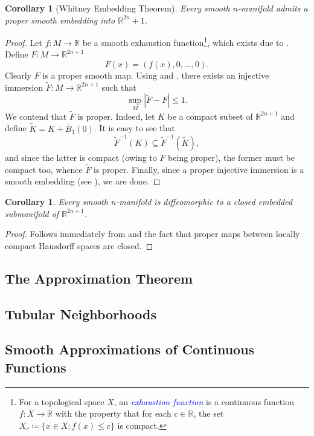 \documentclass[11pt]{article}
\theoremstyle{thmstyle}
\theoremstyle{defstyle}
\newtheorem{corollary}[theorem]{Corollary}
\newcommand{\R}{\mathbb{R}}
\newcommand{\wt}[1]{\widetilde{#1}}
\newcommand{\define}[1]{\textcolor{blue}{\textit{#1}}}
\renewcommand{\le}{\leqslant}
\begin{document}
\begin{corollary}[Whitney Embedding Theorem]
	Every smooth $n$-manifold admits a proper smooth embedding into $\R^{2n} + 1$.
\end{corollary}
\begin{proof}
	Let $f\colon M\to\R$ be a smooth exhaustion function\footnote{For a topological space $X$, an \define{exhaustion function} is a continuous function $f\colon X\to\R$ with the property that for each $c\in\R$, the set $X_c\coloneq\{x\in X\colon f(x)\le c\}$ is compact.}, which exists due to \cite[Proposition 2.28]{lee-smooth-manifolds}. Define $F\colon M\to\R^{2n + 1}$ 
	\begin{equation*}
		F(x) = \left(f(x), 0,\dots, 0\right).
	\end{equation*}
	Clearly $F$ is a proper smooth map. Using  and , there exists an injective immersion $\wt F\colon M\to\R^{2n + 1}$ such that 
	\begin{equation*}
		\sup_{M} |\wt F - F|\le 1.
	\end{equation*}
	We contend that $\wt F$ is proper. Indeed, let $K$ be a compact subset of $\R^{2n + 1}$ and define $\wt K = K + \overline B_1(0)$. It is easy to see that 
	\begin{equation*}
		\wt F^{-1}(K)\subseteq\wt F^{-1}(\wt K),
	\end{equation*}
	and since the latter is compact (owing to $F$ being proper), the former must be compact too, whence $\wt F$ is proper. Finally, since a proper injective immersion is a smooth embedding (see \cite[Proposition 7.4]{lee-smooth-manifolds}), we are done.
\end{proof}

\begin{corollary}
	Every smooth $n$-manifold is diffeomorphic to a closed embedded submanifold of $\R^{2n + 1}$.
\end{corollary}
\begin{proof}
	Follows immediately from  and the fact that proper maps between locally compact Hausdorff spaces are closed.
\end{proof}

\subsection{The Approximation Theorem}

\subsection{Tubular Neighborhoods}

\subsection{Smooth Approximations of Continuous Functions}


\end{document}

